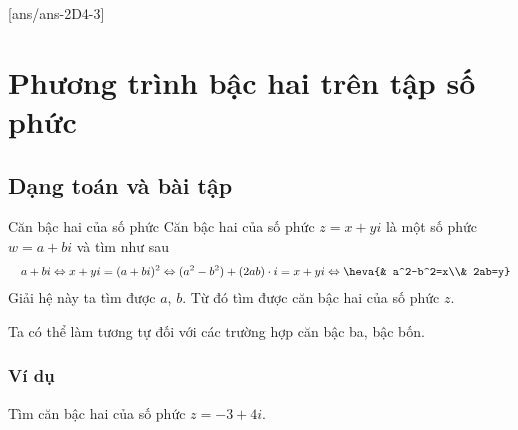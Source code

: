 [ans/ans-2D4-3]
\section{Phương trình bậc hai trên tập số phức}
\subsection{Dạng toán và bài tập}
\begin{dang}{Căn bậc hai của số phức}
	Căn bậc hai của số phức $z=x+yi$ là một số phức $w=a+bi$ và tìm như sau
	\begin{eqnarray*}
		&&a+bi\Leftrightarrow x+yi=(a+bi)^2\Leftrightarrow (a^2-b^2)+(2ab)\cdot i=x+yi
		\Leftrightarrow \heva{& a^2-b^2=x\\& 2ab=y}
	\end{eqnarray*}
	Giải hệ này ta tìm được $a$, $b$. Từ đó tìm được căn bậc hai của số phức $z$.
\end{dang}

\begin{note}
	Ta có thể làm tương tự đối với các trường hợp căn bậc ba, bậc bốn.
\end{note}
\subsubsection{Ví dụ}

\begin{vd}%
	Tìm căn bậc hai của số phức $z=-3+4i$.
\end{vd}

